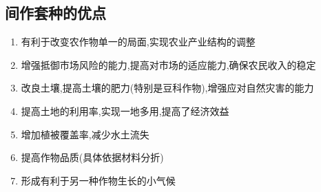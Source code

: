 \documentclass[a4paper]{article}
\begin{document}
    \subsection{间作套种的优点}
    \begin{enumerate}
        \item 有利于改变农作物单一的局面,实现农业产业结构的调整
        \item 增强抵御市场风险的能力,提高对市场的适应能力,确保农民收入的稳定
        \item 改良土壤,提高土壤的肥力(特别是豆科作物),增强应对自然灾害的能力
        \item 提高土地的利用率,实现一地多用,提高了经济效益
        \item 增加植被覆盖率,减少水土流失
        \item 提高作物品质(具体依据材料分折)
        \item 形成有利于另一种作物生长的小气候
    \end{enumerate}
\end{document}
